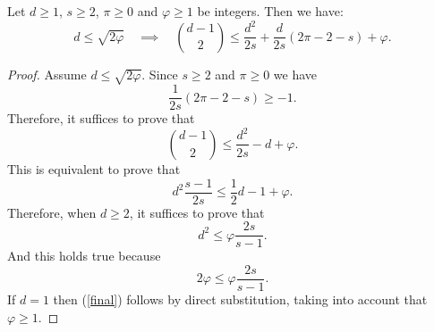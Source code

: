 \documentclass[10pt,a4paper]{amsart}
\begin{document}
\begin{lemma}\label{trecarte} Let $d\geq 1$, $s\geq 2$, $\pi\geq 0$ and $\varphi\geq 1$ be integers. Then we have:
$$
d\leq \sqrt{2\varphi}\quad \implies \quad \binom{d-1}{2}\leq
\frac{d^2}{2s}+\frac{d}{2s}(2\pi-2-s)+\varphi.
$$
\end{lemma}

\begin{proof} Assume  $d\leq \sqrt{2\varphi}$. Since $s\geq 2$ and $\pi\geq 0$ we
have
$$
\frac{1}{2s}(2\pi-2-s)\geq -1.
$$
Therefore, it suffices to prove that
$$
\binom{d-1}{2}\leq \frac{d^2}{2s}-d+\varphi.
$$
This is equivalent to prove that
\begin{equation}\label{final}
d^2\frac{s-1}{2s}\leq \frac{1}{2}d-1+\varphi.
\end{equation}
Therefore, when $d\geq 2$, it suffices to prove that
$$
d^2\leq \varphi \frac{2s}{s-1}.
$$
And this holds true because
$$
2\varphi \leq\varphi \frac{2s}{s-1}.
$$
If $d=1$ then (\ref{final}) follows by direct substitution, taking
into account that $\varphi\geq 1$.
\end{proof}
\end{document}
